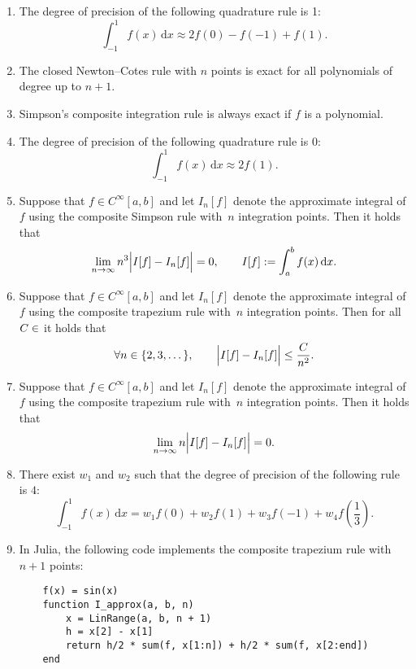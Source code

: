 \documentclass[a4paper]{article}
\renewcommand{\d}{\mathrm d}
\begin{document}
\begin{enumerate}

    \item
        The degree of precision of the following quadrature rule is 1:
        \[
            \int_{-1}^{1} f(x) \, \d x
            \approx 2 f(0) - f(-1) + f(1).
        \]

    \item
        The closed Newton--Cotes rule with $n$ points is exact for all polynomials of degree up to $n+1$.

    \item
        Simpson's composite integration rule is always exact if $f$ is a polynomial.

    \item
        The degree of precision of the following quadrature rule is 0:
        \[
            \int_{-1}^1 f(x) \, \d x \approx 2f(1).
        \]

    \item
        Suppose that $f \in C^{\infty}[a, b]$ and let $I_n[f]$ denote the approximate integral of $f$ using the composite Simpson rule
        with~$n$ integration points.
        Then it holds that
        \[
            \lim_{n \to \infty} n^3 \Bigl\lvert I[f] - I_n[f] \Bigr\rvert = 0, \qquad I[f] := \int_{a}^{b} f(x) \, \d x.
        \]

    \item
        Suppose that $f \in C^{\infty}[a, b]$ and let $I_n[f]$ denote the approximate integral of $f$ using the composite trapezium rule
        with~$n$ integration points.
        Then for all $C \in \real$ it holds that
        \[
             \forall n \in \{2, 3, \dotsc \}, \qquad
             \Bigl\lvert I[f] - I_n[f] \Bigr\rvert \leq \frac{C}{n^2}.
        \]

    \item
        Suppose that $f \in C^{\infty}[a, b]$ and let $I_n[f]$ denote the approximate integral of $f$ using the composite trapezium rule
        with~$n$ integration points.
        Then it holds that
        \[
             \lim_{n \to \infty} n \Bigl\lvert I[f] - I_n[f] \Bigr\rvert = 0.
        \]

    \item
        There exist $w_1$ and $w_2$ such that the degree of precision of the following rule is $4$:
        \[
            \int_{-1}^1 f(x) \, \d x
            = w_1 f(0) + w_2 f(1) + w_3 f(-1) + w_4 f \left( \frac{1}{3} \right).
        \]

    \item
        In Julia, the following code implements the composite trapezium rule with $n+1$ points:
        \begin{verbatim}
    f(x) = sin(x)
    function I_approx(a, b, n)
        x = LinRange(a, b, n + 1)
        h = x[2] - x[1]
        return h/2 * sum(f, x[1:n]) + h/2 * sum(f, x[2:end])
    end
        \end{verbatim}


\end{enumerate}
\end{document}

